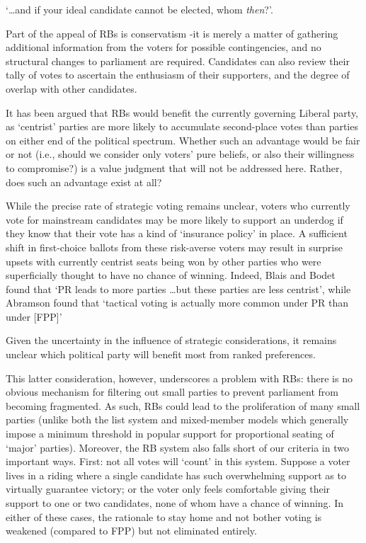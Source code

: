\begin{tcolorbox}[colback=white!5!white,colframe=blue!55!black]
`\ldots and if your ideal candidate cannot be elected, whom \emph{then}?'.
\end{tcolorbox}

Part of the appeal of RBs is conservatism \--it is merely a matter of gathering additional information from the voters for possible contingencies, and no structural changes to parliament are required. Candidates can also review their tally of votes to ascertain the enthusiasm of their supporters, and the degree of overlap with other candidates.

It has been argued\cite{Record} that RBs would benefit the currently governing Liberal party, as `centrist' parties are more likely to accumulate second-place votes than parties on either end of the political spectrum.
Whether such an advantage would be fair or not (i.e., should we consider only voters' pure beliefs, or also their willingness to compromise?) is a value judgment that will not be addressed here. Rather, does such an advantage exist at all?

While the precise rate of strategic voting remains unclear, voters who currently vote for mainstream candidates may be more likely to support an underdog if they know that their vote has a kind of `insurance policy' in place.
A sufficient shift in first-choice ballots from these risk-averse voters may result in surprise upsets with currently centrist seats being won by other parties who were superficially thought to have no chance of winning. Indeed, Blais and Bodet found that `PR  leads to more parties \ldots but these parties are less centrist'\cite{Blais_2006}, while Abramson found that `tactical voting is actually more common under PR than under [FPP]' \cite{Abramson_2010}



Given the uncertainty in the influence of strategic considerations, it remains  unclear which political party will benefit most from ranked preferences.

This latter consideration, however, underscores a problem with RBs:  there is no obvious mechanism for filtering out small parties to prevent parliament from becoming fragmented. As such, RBs could lead to the proliferation of many small parties
(unlike both the list system and  mixed-member models which generally impose a minimum threshold in popular support for proportional seating of `major' parties).
Moreover, the RB system also falls short of our criteria in two important ways.
First: not all votes will `count' in this system.
Suppose a voter lives in a riding where a single candidate has such overwhelming support as to virtually guarantee victory; or the voter only feels comfortable giving their support to one or two candidates, none of whom have a chance of winning.
In either of these cases, the rationale to stay home and not bother voting is weakened (compared to FPP) but not eliminated entirely.

